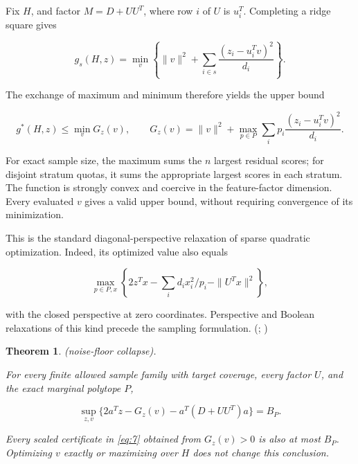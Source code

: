 \documentclass[11pt]{article}
\newtheorem{theorem}{Theorem}
\begin{document}
Fix \(H\), and factor \(M=D+UU^T\), where row \(i\) of \(U\) is
\(u_i^T\). Completing a ridge square gives

\begin{equation}\label{eq:9}
g_s(H,z)=\min_v\left\{\|v\|^2+
\sum_{i\in s}\frac{(z_i-u_i^Tv)^2}{d_i}\right\}. 
\end{equation}

The exchange of maximum and minimum therefore yields the upper bound

\begin{equation}\label{eq:10}
g^*(H,z)\le \min_v G_z(v),\qquad
G_z(v)=\|v\|^2+\max_{p\in P}
\sum_i p_i\frac{(z_i-u_i^Tv)^2}{d_i}. 
\end{equation}

For exact sample size, the maximum sums the \(n\) largest residual
scores; for disjoint stratum quotas, it sums the appropriate largest
scores in each stratum. The function is strongly convex and coercive in
the feature-factor dimension. Every evaluated \(v\) gives a valid upper
bound, without requiring convergence of its minimization.

This is the standard diagonal-perspective relaxation of sparse quadratic
optimization. Indeed, its optimized value also equals

\begin{equation}\label{eq:11}
\max_{p\in P,x}\left\{
2z^Tx-\sum_i d_ix_i^2/p_i-\|U^Tx\|^2\right\}, 
\end{equation}

with the closed perspective at zero coordinates. Perspective and Boolean
relaxations of this kind precede the sampling formulation.
(\citealp[Sections 2.1--2.3]{AskariEtAl2021};
\citealp[Sections 2--3]{PilanciEtAl2015})

\begin{theorem}\label{th:2} (noise-floor collapse).

For every finite allowed sample family with target coverage, every
factor \(U\), and the exact marginal polytope \(P\),

\begin{equation}\label{eq:12}
\boxed{\sup_{z,v}\{2a^Tz-G_z(v)-a^T(D+UU^T)a\}=B_P.} 
\end{equation}

Every scaled certificate in \eqref{eq:7} obtained from \(G_z(v)>0\) is
also at most \(B_P\). Optimizing \(v\) exactly or maximizing over \(H\)
does not change this conclusion.

\end{theorem}
\end{document}
